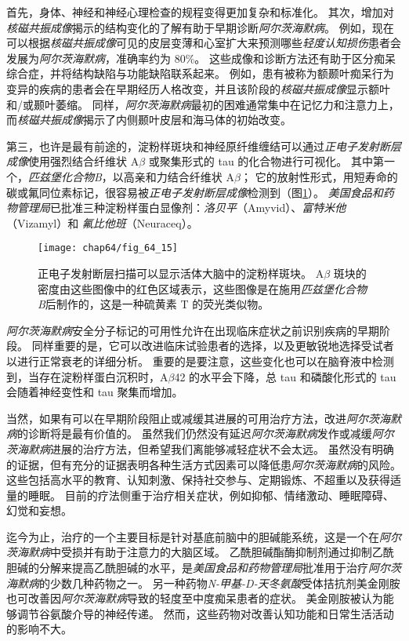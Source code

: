 首先，身体、神经和神经心理检查的规程变得更加复杂和标准化。
其次，增加对\textit{核磁共振成像}揭示的结构变化的了解有助于早期诊断\textit{阿尔茨海默病}。
例如，现在可以根据\textit{核磁共振成像}可见的皮层变薄和心室扩大来预测哪些\textit{轻度认知损伤}患者会发展为\textit{阿尔茨海默病}，准确率约为 80\%。
这些成像和诊断方法还有助于区分痴呆综合症，并将结构缺陷与功能缺陷联系起来。
例如，患有被称为额颞叶痴呆行为变异的疾病的患者会在早期经历人格改变，并且该阶段的\textit{核磁共振成像}显示额叶和/或颞叶萎缩。
同样，\textit{阿尔茨海默病}最初的困难通常集中在记忆力和注意力上，而\textit{核磁共振成像}揭示了内侧颞叶皮层和海马体的初始改变。


第三，也许是最有前途的，淀粉样斑块和神经原纤维缠结可以通过\textit{正电子发射断层成像}使用强烈结合纤维状 A$\beta$ 或聚集形式的 tau 的化合物进行可视化。
其中第一个，\textit{匹兹堡化合物B}，以高亲和力结合纤维状 A$\beta$；
它的放射性形式，用短寿命的碳或氟同位素标记，很容易被\textit{正电子发射断层成像}检测到（图\ref{fig:64_15}）。
\textit{美国食品和药物管理局}已批准三种淀粉样蛋白显像剂：\textit{洛贝平}（Amyvid）、\textit{富特米他}（Vizamyl）和 \textit{氟比他班}（Neuraceq）。


\begin{figure}[htbp]
	\centering
	\texttt{[image: chap64/fig\_64\_15]}
	\caption{正电子发射断层扫描可以显示活体大脑中的淀粉样斑块。
		A$\beta$ 斑块的密度由这些图像中的红色区域表示，这些图像是在施用\textit{匹兹堡化合物B}后制作的，这是一种硫黄素 T 的荧光类似物。}
	\label{fig:64_15}
\end{figure}


\textit{阿尔茨海默病}安全分子标记的可用性允许在出现临床症状之前识别疾病的早期阶段。
同样重要的是，它可以改进临床试验患者的选择，以及更敏锐地选择受试者以进行正常衰老的详细分析。
重要的是要注意，这些变化也可以在脑脊液中检测到，当存在淀粉样蛋白沉积时，A$\beta$42 的水平会下降，总 tau 和磷酸化形式的 tau 会随着神经变性和 tau 聚集而增加。


当然，如果有可以在早期阶段阻止或减缓其进展的可用治疗方法，改进\textit{阿尔茨海默病}的诊断将是最有价值的。
虽然我们仍然没有延迟\textit{阿尔茨海默病}发作或减缓\textit{阿尔茨海默病}进展的治疗方法，但希望我们离能够减轻症状不会太远。
虽然没有明确的证据，但有充分的证据表明各种生活方式因素可以降低患\textit{阿尔茨海默病}的风险。
这些包括高水平的教育、认知刺激、保持社交参与、定期锻炼、不超重以及获得适量的睡眠。
目前的疗法侧重于治疗相关症状，例如抑郁、情绪激动、睡眠障碍、幻觉和妄想。


迄今为止，治疗的一个主要目标是针对基底前脑中的胆碱能系统，这是一个在\textit{阿尔茨海默病}中受损并有助于注意力的大脑区域。
乙酰胆碱酯酶抑制剂通过抑制乙酰胆碱的分解来提高乙酰胆碱的水平，是\textit{美国食品和药物管理局}批准用于治疗\textit{阿尔茨海默病}的少数几种药物之一。
另一种药物\textit{N-甲基-D-天冬氨酸}受体拮抗剂美金刚胺也可改善因\textit{阿尔茨海默病}导致的轻度至中度痴呆患者的症状。
美金刚胺被认为能够调节谷氨酸介导的神经传递。
然而，这些药物对改善认知功能和日常生活活动的影响不大。


